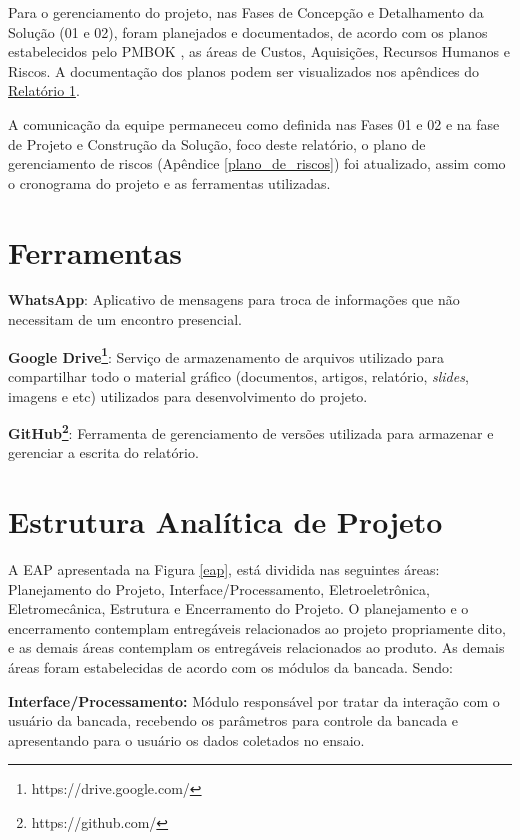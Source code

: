 Para o gerenciamento do projeto, nas Fases de Concepção e Detalhamento da Solução (01 e 02), foram planejados e documentados, de acordo com os planos estabelecidos pelo PMBOK \cite{pmbok}, as 
áreas de Custos, Aquisições, Recursos Humanos e Riscos. A documentação dos planos podem ser visualizados nos apêndices do 
\href{https://drive.google.com/file/d/0B5InkGKx6O-MR1B3eVYzZFpjQ3c/view?usp=sharing}{Relatório 1}. 

A comunicação da equipe permaneceu como definida nas Fases 01 e 02 e na fase de Projeto e Construção da Solução, foco deste relatório, o plano de gerenciamento de riscos 
(Apêndice \ref{plano_de_riscos}) foi atualizado, assim como o cronograma do projeto e as ferramentas utilizadas. 

\section*{Ferramentas}

\textbf{WhatsApp}:
Aplicativo de mensagens para troca de informações que não necessitam de um encontro presencial.

\textbf{Google Drive\footnote{https://drive.google.com/}}: Serviço de armazenamento de arquivos utilizado para compartilhar todo o material gráfico (documentos, artigos, relatório, \textit{slides}, imagens e etc) utilizados para desenvolvimento do projeto.

\textbf{GitHub\footnote{https://github.com/}}: Ferramenta de gerenciamento de versões utilizada para armazenar e gerenciar 
a escrita do relatório.

\section*{Estrutura Analítica de Projeto}

A EAP apresentada na Figura \ref{eap}, está dividida nas seguintes áreas: Planejamento do Projeto, Interface/Processamento, Eletroeletrônica, Eletromecânica, Estrutura e Encerramento do Projeto. O planejamento e o encerramento contemplam entregáveis relacionados ao projeto propriamente dito, e as demais áreas contemplam os entregáveis relacionados ao produto. As demais áreas foram estabelecidas de acordo com os módulos da bancada. Sendo:

\textbf{Interface/Processamento:} Módulo responsável por tratar da interação com o usuário da bancada, recebendo os parâmetros para controle da bancada e apresentando para o usuário os dados coletados no ensaio.

